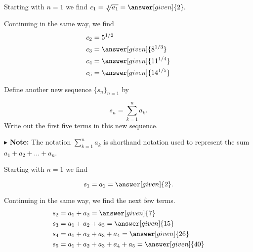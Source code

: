 \documentclass{ximera}
\begin{document}
\begin{example}
\begin{question}
\begin{explanation}
Starting with $n=1$ we find  $c_1 = \sqrt[1]{a_1} = \answer[given]{2}.$
      
Continuing in the same way, we find     
     \begin{align*}
      	c_2 &=  5^{1/2}  \\ 
	c_3 &= \answer[given]{8^{1/3}}   \\ 
	c_4 &= \answer[given]{11^{1/4}}   \\ 
	c_5 &=  \answer[given]{14^{1/5}}   
    \end{align*}
    
\end{explanation}
\end{question}

\begin{question}
Define another new sequence $\{s_n\}_{n=1}$ by 

\[
s_n = \sum_{k=1}^n a_k .
\]
Write out the first five terms in this new sequence.

$\blacktriangleright$ \textbf{Note:} The notation $\sum\limits_{k=1}^n a_k$ is shorthand notation used to represent the sum $a_1+a_2+\ldots +a_n$.



\begin{explanation}
Starting with $n=1$ we find

\[      s_1 = a_1 = \answer[given]{2}.      \]
      
Continuing in the same way, we find the next few terms.    
     \begin{align*}
      	s_2 &=  a_1 +a_2 = \answer[given]{7}  \\ 
	s_3 &=  a_1 +a_2 + a_3 = \answer[given]{15}   \\ 
	s_4 &=  a_1 +a_2 +a_3 +a_4= \answer[given]{26}  \\ 
	s_5 &=  a_1 +a_2 +a_3+a_4+a_5= \answer[given]{40}    
    \end{align*}
\end{explanation}
\end{question}
\end{example}
\end{document}
